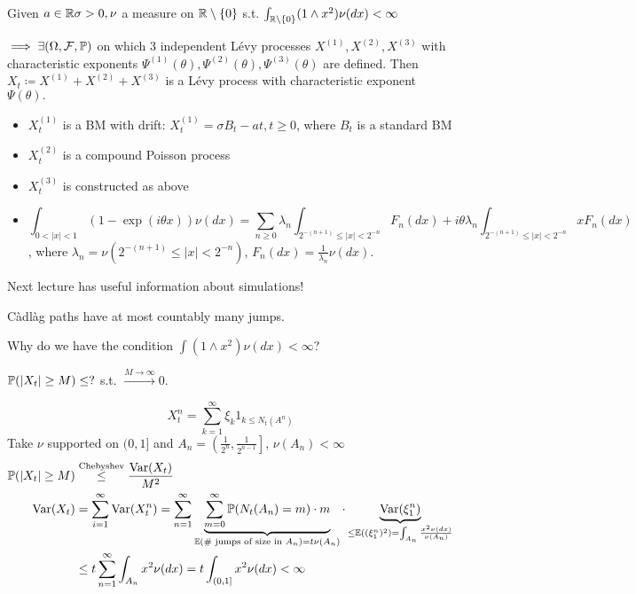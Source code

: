 \begin{theorem}\label{thm:4.7}
Given $a\in\mathbb{R}\sigma>0,\nu$ a measure on $\mathbb{R}\setminus\{0\}$ s.t. $\int_{\mathbb{R}\setminus\{0\}}(1\land x^2)\nu(dx)<\infty$

$\implies \exists(\Omega,\mathcal{F},\mathbb{P})$ on which 3 independent Lévy processes $X^{(1)},X^{(2)},X^{(3)}$
with characteristic exponents $\Psi^{(1)}(\theta),\Psi^{(2)}(\theta),\Psi^{(3)}(\theta)$ are defined.
Then $X_t\coloneqq X^{(1)}+X^{(2)}+X^{(3)}$ is a Lévy process with characteristic exponent $\Psi(\theta).$

\begin{itemize}
    \item $X_t^{(1)}$ is a BM with drift: $X_t^{(1)}=\sigma B_t-at,t\geq 0$, where $B_t$ is a standard BM 
    \item $X_t^{(2)}$ is a compound Poisson process 
    \item $X_t^{(3)}$ is constructed as above
    \item \[\int_{0<|x|<1} (1-\exp(i\theta x))\nu(dx)=\sum_{n\geq 0}\lambda_n\int_{2^{-(n+1)}\leq |x|<2^{-n}} F_n(dx)+i\theta\lambda_n\int_{2^{-(n+1)}\leq |x|<2^{-n}} x F_n(dx)\], where 
        $\lambda_n=\nu(2^{-(n+1)}\leq |x|<2^{-n})$, $F_n(dx)=\frac{1}{\lambda_n}\nu(dx)$.
\end{itemize}

\end{theorem}

Next lecture has useful information about simulations!


\begin{remark}
    Càdlàg paths have at most countably many jumps.
\end{remark}

Why do we have the condition $\int (1\land x^2)\nu(dx)<\infty$?

$\mathbb{P}(|X_t|\geq M)\leq ?$ s.t. $\stackrel{M\to\infty}{\to} 0$. 

\[X_t^n=\sum_{k=1}^{\infty} \xi_k 1_{k\leq N_t(A^n)}\]
Take $\nu$ supported on $(0,1]$ and $A_n=\left(\frac{1}{2^n},\frac{1}{2^{n-1}}\right]$, $\nu(A_n)<\infty$
\begin{align*}
    \mathbb{P}(|X_t|\geq M)&\stackrel{\text{Chebyshev}}{\leq} \frac{\text{Var}(X_t)}{M^2}\\
    \text{Var}(X_t)&=\sum_{i=1}^\infty\text{Var}(X_t^n)=\sum_{n=1}^\infty\underbrace{\sum_{m=0}^\infty \mathbb{P}(N_t(A_n)=m)\cdot m}_{\mathbb{E}(\#\text{ jumps of size in }A_n)=t\nu(A_n)} \cdot \underbrace{\text{Var}(\xi_1^n)}_{\leq \mathbb{E}((\xi_1^n)^2)=\int_{A_n}\frac{x^2\nu(dx)}{\nu(A_n)}}\\
    &\leq t\sum_{n=1}^\infty \int_{A_n} x^2\nu(dx)=t\int_{(0,1]}x^2 \nu(dx)<\infty
\end{align*}

